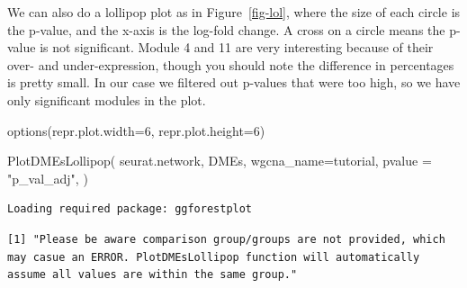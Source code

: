\documentclass[
  letterpaper,
  DIV=11,
  numbers=noendperiod]{scrartcl}
\newenvironment{Shaded}{\begin{snugshade}}{\end{snugshade}}
\newcommand{\AttributeTok}[1]{\textcolor[rgb]{0.40,0.45,0.13}{#1}}
\newcommand{\DecValTok}[1]{\textcolor[rgb]{0.68,0.00,0.00}{#1}}
\newcommand{\FunctionTok}[1]{\textcolor[rgb]{0.28,0.35,0.67}{#1}}
\newcommand{\NormalTok}[1]{\textcolor[rgb]{0.00,0.23,0.31}{#1}}
\newcommand{\StringTok}[1]{\textcolor[rgb]{0.13,0.47,0.30}{#1}}
\begin{document}
We can also do a lollipop plot as in Figure~\ref{fig-lol}, where the
size of each circle is the p-value, and the x-axis is the log-fold
change. A cross on a circle means the p-value is not significant. Module
4 and 11 are very interesting because of their over- and
under-expression, though you should note the difference in percentages
is pretty small. In our case we filtered out p-values that were too
high, so we have only significant modules in the plot.

\begin{Shaded}
\begin{Highlighting}[]
\FunctionTok{options}\NormalTok{(}\AttributeTok{repr.plot.width=}\DecValTok{6}\NormalTok{, }\AttributeTok{repr.plot.height=}\DecValTok{6}\NormalTok{)}

\FunctionTok{PlotDMEsLollipop}\NormalTok{(}
\NormalTok{  seurat.network, }
\NormalTok{  DMEs, }
  \AttributeTok{wgcna\_name=}\StringTok{\textquotesingle{}tutorial\textquotesingle{}}\NormalTok{, }
  \AttributeTok{pvalue =} \StringTok{"p\_val\_adj"}\NormalTok{,}
\NormalTok{)}
\end{Highlighting}
\end{Shaded}

\begin{verbatim}
Loading required package: ggforestplot
\end{verbatim}

\begin{verbatim}
[1] "Please be aware comparison group/groups are not provided, which may casue an ERROR. PlotDMEsLollipop function will automatically assume all values are within the same group."
\end{verbatim}
\end{document}
